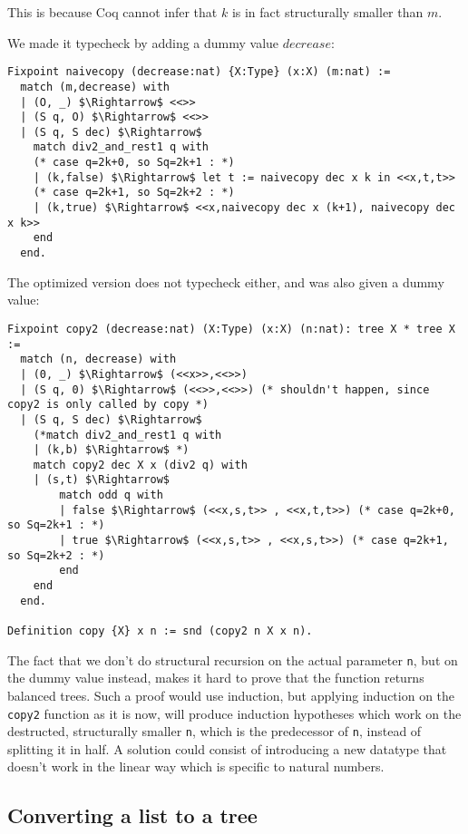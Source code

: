 \documentclass[a4paper,10pt]{article}
\begin{document}
This is because Coq cannot infer that $k$ is in fact structurally smaller than $m$.

We made it typecheck by adding a dummy value $decrease$:

\begin{lstlisting}[mathescape=true]
Fixpoint naivecopy (decrease:nat) {X:Type} (x:X) (m:nat) :=
  match (m,decrease) with
  | (O, _) $\Rightarrow$ <<>>
  | (S q, O) $\Rightarrow$ <<>>
  | (S q, S dec) $\Rightarrow$
    match div2_and_rest1 q with
    (* case q=2k+0, so Sq=2k+1 : *)
    | (k,false) $\Rightarrow$ let t := naivecopy dec x k in <<x,t,t>>
    (* case q=2k+1, so Sq=2k+2 : *) 
    | (k,true) $\Rightarrow$ <<x,naivecopy dec x (k+1), naivecopy dec x k>>
    end
  end.
\end{lstlisting}

The optimized version does not typecheck either, and was also given a dummy value:

\begin{lstlisting}[mathescape=true]
Fixpoint copy2 (decrease:nat) (X:Type) (x:X) (n:nat): tree X * tree X :=
  match (n, decrease) with 
  | (0, _) $\Rightarrow$ (<<x>>,<<>>)
  | (S q, 0) $\Rightarrow$ (<<>>,<<>>) (* shouldn't happen, since copy2 is only called by copy *)
  | (S q, S dec) $\Rightarrow$
    (*match div2_and_rest1 q with
    | (k,b) $\Rightarrow$ *)
    match copy2 dec X x (div2 q) with
    | (s,t) $\Rightarrow$
        match odd q with
        | false $\Rightarrow$ (<<x,s,t>> , <<x,t,t>>) (* case q=2k+0, so Sq=2k+1 : *)
        | true $\Rightarrow$ (<<x,s,t>> , <<x,s,t>>) (* case q=2k+1, so Sq=2k+2 : *) 
        end
    end
  end.

Definition copy {X} x n := snd (copy2 n X x n).
\end{lstlisting}

The fact that we don't do structural recursion on the actual parameter \texttt{n}, but on the dummy value instead, makes it hard to prove 
that the function returns balanced trees. Such a proof would use induction, but applying induction on the \texttt{copy2} function
as it is now, will produce induction hypotheses which work on the destructed, structurally smaller \texttt{n}, which is the predecessor
of \texttt{n}, instead of splitting it in half. A solution could consist of introducing a new datatype that doesn't work in the linear way
which is specific to natural numbers.

\subsection{Converting a list to a tree}
\end{document}
